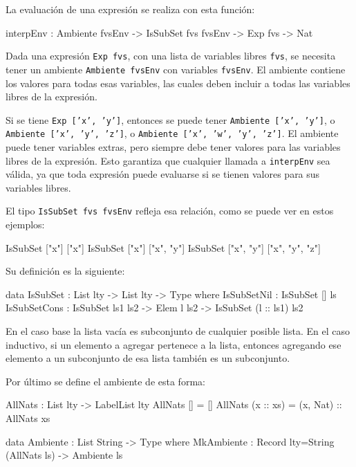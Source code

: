 La evaluación de una expresión se realiza con esta función:

\begin{code}
interpEnv : Ambiente fvsEnv -> IsSubSet fvs fvsEnv ->
  Exp fvs -> Nat
\end{code}

Dada una expresión \texttt{Exp fvs}, con una lista de variables libres \texttt{fvs}, se necesita tener un ambiente \texttt{Ambiente fvsEnv} con variables \texttt{fvsEnv}. El ambiente contiene los valores para todas esas variables, las cuales deben incluir a todas las variables libres de la expresión.

Si se tiene \texttt{Exp ['x', 'y']}, entonces se puede tener \texttt{Ambiente ['x', 'y']}, o \texttt{Ambiente ['x', 'y', 'z']}, o \texttt{Ambiente ['x', 'w', 'y', 'z']}. El ambiente puede tener variables extras, pero siempre debe tener valores para las variables libres de la expresión. Esto garantiza que cualquier llamada a \texttt{interpEnv} sea válida, ya que toda expresión puede evaluarse si se tienen valores para sus variables libres.

El tipo \texttt{IsSubSet fvs fvsEnv} refleja esa relación, como se puede ver en estos ejemplos:

\begin{code}
IsSubSet ["x"] ["x"]
IsSubSet ["x"] ["x", "y"]
IsSubSet ["x", "y"] ["x", "y", "z"]
\end{code}

Su definición es la siguiente:

\begin{code}
data IsSubSet : List lty -> List lty -> Type where
  IsSubSetNil : IsSubSet [] ls
  IsSubSetCons : IsSubSet ls1 ls2 -> Elem l ls2 ->
    IsSubSet (l :: ls1) ls2
\end{code}

En el caso base la lista vacía es subconjunto de cualquier posible lista. En el caso inductivo, si un elemento a agregar pertenece a la lista, entonces agregando ese elemento a un subconjunto de esa lista también es un subconjunto.

Por último se define el ambiente de esta forma:

\begin{code}
AllNats : List lty -> LabelList lty
AllNats [] = []
AllNats (x :: xs) = (x, Nat) :: AllNats xs

data Ambiente : List String -> Type where
  MkAmbiente : Record {lty=String} (AllNats ls) -> Ambiente ls
\end{code}

